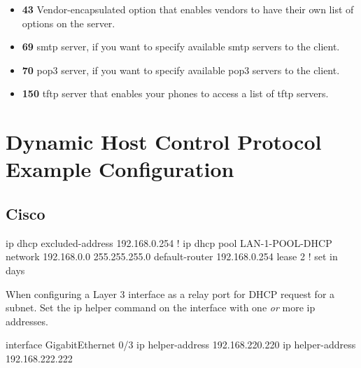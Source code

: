\begin{itemize}
    \item \textbf{43} Vendor-encapsulated option that enables vendors to have their own list of options on the server.
    \item \textbf{69} \gls{smtp} server, if you want to specify available \gls{smtp} servers to the client.
    \item \textbf{70} \gls{pop3} server, if you want to specify available \gls{pop3} servers to the client.
    \item \textbf{150} \gls{tftp} server that enables your phones to access a list of \gls{tftp} servers.
\end{itemize}

\section[DHCP Example Configuration]{Dynamic Host Control Protocol Example Configuration}

\subsection{Cisco}

\begin{cisco}
ip dhcp excluded-address 192.168.0.254
!
ip dhcp pool LAN-1-POOL-DHCP
 network 192.168.0.0 255.255.255.0
 default-router 192.168.0.254
 lease 2 ! set in days
\end{cisco}

When configuring a Layer 3 interface as a relay port for DHCP request for a subnet. Set the ip helper command on the interface with one \textit{or} more ip addresses.

\begin{cisco}
interface GigabitEthernet 0/3
 ip helper-address 192.168.220.220
 ip helper-address 192.168.222.222
\end{cisco}

